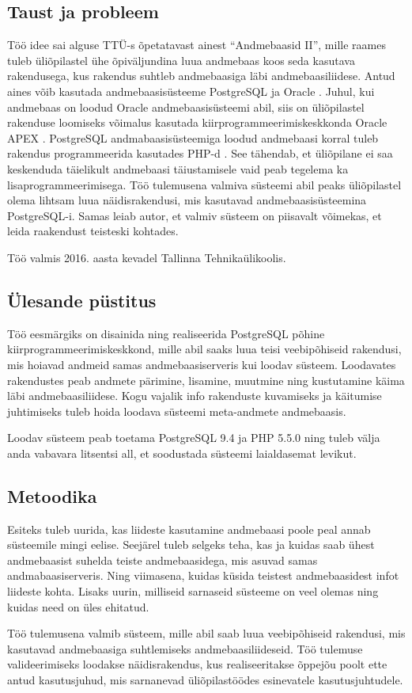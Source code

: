 \documentclass[a4paper,12pt]{article} %
\begin{document}
\subsection{Taust ja probleem}
Töö idee sai alguse TTÜ-s õpetatavast ainest ``Andmebaasid II'', mille raames tuleb üliõpilastel ühe õpiväljundina luua andmebaas koos seda kasutava rakendusega, kus rakendus suhtleb andmebaasiga läbi andmebaasiliidese. Antud aines võib kasutada andmebaasisüsteeme PostgreSQL \cite{PostgreSQL} ja Oracle \cite{Oracle_DB}. Juhul, kui andmebaas on loodud Oracle andmebaasisüsteemi abil, siis on üliõpilastel rakenduse loomiseks võimalus kasutada kiirprogrammeerimiskeskkonda Oracle APEX \cite{Oracle_APEX}. PostgreSQL andmabaasisüsteemiga loodud andmebaasi korral tuleb rakendus programmeerida kasutades PHP-d \cite{PHP}. See tähendab, et üliõpilane ei saa keskenduda täielikult andmebaasi täiustamisele vaid peab tegelema ka lisaprogrammeerimisega. Töö tulemusena valmiva süsteemi abil peaks üliõpilastel olema lihtsam luua näidisrakendusi, mis kasutavad andmebaasisüsteemina PostgreSQL-i. Samas leiab autor, et valmiv süsteem on piisavalt võimekas, et leida raakendust teisteski kohtades.\par
Töö valmis 2016. aasta kevadel Tallinna Tehnikaülikoolis.

\subsection{Ülesande püstitus}
Töö eesmärgiks on disainida ning realiseerida PostgreSQL põhine kiirprogrammeerimiskeskkond, mille abil saaks luua teisi veebipõhiseid rakendusi, mis hoiavad andmeid samas andmebaasiserveris kui loodav süsteem. Loodavates rakendustes peab andmete pärimine, lisamine, muutmine ning kustutamine käima läbi andmebaasiliidese. Kogu vajalik info rakenduste kuvamiseks ja käitumise juhtimiseks tuleb hoida loodava süsteemi meta-andmete andmebaasis.\par
Loodav süsteem peab toetama PostgreSQL 9.4 ja PHP 5.5.0 ning tuleb välja anda vabavara litsentsi all, et soodustada süsteemi laialdasemat levikut.

\subsection{Metoodika}
Esiteks tuleb uurida, kas liideste kasutamine andmebaasi poole peal annab süsteemile mingi eelise. Seejärel tuleb selgeks teha, kas ja kuidas saab ühest andmebaasist suhelda teiste andmebaasidega, mis asuvad samas andmabaasiserveris. Ning viimasena, kuidas küsida teistest andmebaasidest infot liideste kohta.
Lisaks uurin, milliseid sarnaseid süsteeme on veel olemas ning kuidas need on üles ehitatud.\par
Töö tulemusena valmib süsteem, mille abil saab luua veebipõhiseid rakendusi, mis kasutavad andmebaasiga suhtlemiseks andmebaasiliideseid. Töö tulemuse valideerimiseks loodakse näidisrakendus, kus realiseeritakse õppejõu poolt ette antud kasutusjuhud, mis sarnanevad üliõpilastöödes esinevatele kasutusjuhtudele.
\end{document}
